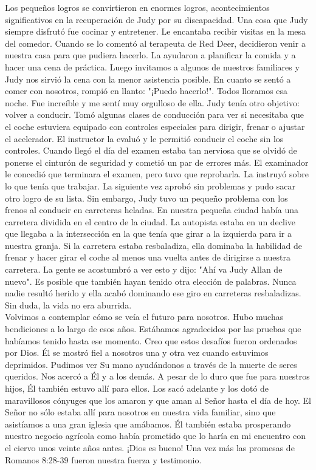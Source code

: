 \documentclass[twoside, 12pt]{book}
\begin{document}
Los pequeños logros se convirtieron en enormes logros, acontecimientos significativos en la recuperación de Judy por su discapacidad. Una cosa que Judy siempre disfrutó fue cocinar y entretener. Le encantaba recibir visitas en la mesa del comedor. Cuando se lo comentó al terapeuta de Red Deer, decidieron venir a nuestra casa para que pudiera hacerlo. La ayudaron a planificar la comida y a hacer una cena de práctica. Luego invitamos a algunos de nuestros familiares y Judy nos sirvió la cena con la menor asistencia posible. En cuanto se sentó a comer con nosotros, rompió en llanto: "¡Puedo hacerlo!". Todos lloramos esa noche. Fue increíble y me sentí muy orgulloso de ella. Judy tenía otro objetivo: volver a conducir. Tomó algunas clases de conducción para ver si necesitaba que el coche estuviera equipado con controles especiales para dirigir, frenar o ajustar el acelerador. El instructor la evaluó y le permitió conducir el coche sin los controles. Cuando llegó el día del examen estaba tan nerviosa que se olvidó de ponerse el cinturón de seguridad y cometió un par de errores más. El examinador le concedió que terminara el examen, pero tuvo que reprobarla. La instruyó sobre lo que tenía que trabajar. La siguiente vez aprobó sin problemas y pudo sacar otro logro de su lista. Sin embargo, Judy tuvo un pequeño problema con los frenos al conducir en carreteras heladas. En nuestra pequeña ciudad había una carretera dividida en el centro de la ciudad. La autopista estaba en un declive que llegaba a la intersección en la que tenía que girar a la izquierda para ir a nuestra granja. Si la carretera estaba resbaladiza, ella dominaba la habilidad de frenar y hacer girar el coche al menos una vuelta antes de dirigirse a nuestra carretera. La gente se acostumbró a ver esto y dijo: "Ahí va Judy Allan de nuevo". Es posible que también hayan tenido otra elección de palabras. Nunca nadie resultó herido y ella acabó dominando ese giro en carreteras resbaladizas. Sin duda, la vida no era aburrida.\\

Volvimos a contemplar cómo se veía el futuro para nosotros. Hubo muchas bendiciones a lo largo de esos años. Estábamos agradecidos por las pruebas que habíamos tenido hasta ese momento. Creo que estos desafíos fueron ordenados por Dios. Él se mostró fiel a nosotros una y otra vez cuando estuvimos deprimidos. Pudimos ver Su mano ayudándonos a través de la muerte de seres queridos. Nos acercó a Él y a los demás. A pesar de lo duro que fue para nuestros hijos, Él también estuvo allí para ellos. Los sacó adelante y los dotó de maravillosos cónyuges que los amaron y que aman al Señor hasta el día de hoy. El Señor no sólo estaba allí para nosotros en nuestra vida familiar, sino que asistíamos a una gran iglesia que amábamos. Él también estaba prosperando nuestro negocio agrícola como había prometido que lo haría en mi encuentro con el ciervo unos veinte años antes. ¡Dios es bueno! Una vez más las promesas de Romanos 8:28-39 fueron nuestra fuerza y testimonio.\\
\end{document}
